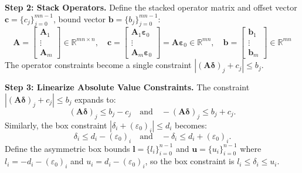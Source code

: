 \documentclass{article}
\begin{document}
\textbf{Step 2: Stack Operators.} Define the stacked operator matrix and offset vector $\mathbf{c} = \{c_j\}_{j=0}^{mn-1}$, bound vector $\mathbf{b} = \{b_j\}_{j=0}^{mn-1}$:
\begin{equation}
    \mathbf{A} = \begin{bmatrix} \mathbf{A}_1 \\ \vdots \\ \mathbf{A}_m \end{bmatrix} \in \mathbb{R}^{mn \times n}, \quad
    \mathbf{c} = \begin{bmatrix} \mathbf{A}_1 \boldsymbol{\varepsilon}_0 \\ \vdots \\ \mathbf{A}_m \boldsymbol{\varepsilon}_0 \end{bmatrix} = \mathbf{A} \boldsymbol{\varepsilon}_0 \in \mathbb{R}^{mn}, \quad
    \mathbf{b} = \begin{bmatrix} \mathbf{b}_1 \\ \vdots \\ \mathbf{b}_m \end{bmatrix} \in \mathbb{R}^{mn}
\end{equation}
The operator constraints become a single constraint $|(\mathbf{A}\boldsymbol{\delta})_j + c_j| \le b_j$.

\textbf{Step 3: Linearize Absolute Value Constraints.} The constraint $|(\mathbf{A}\boldsymbol{\delta})_j + c_j| \le b_j$ expands to:
\begin{equation}
    (\mathbf{A}\boldsymbol{\delta})_j \le b_j - c_j \quad \text{and} \quad -(\mathbf{A}\boldsymbol{\delta})_j \le b_j + c_j.
\end{equation}
Similarly, the box constraint $|\delta_i + (\varepsilon_0)_i| \le d_i$ becomes:
\begin{equation}
    \delta_i \le d_i - (\varepsilon_0)_i \quad \text{and} \quad -\delta_i \le d_i + (\varepsilon_0)_i.
\end{equation}
Define the asymmetric box bounds $\mathbf{l} = \{l_i\}_{i=0}^{n-1}$ and $\mathbf{u} = \{u_i\}_{i=0}^{n-1}$ where $l_i = -d_i - (\varepsilon_0)_i$ and $u_i = d_i - (\varepsilon_0)_i$, so the box constraint is $l_i \le \delta_i \le u_i$.
\end{document}
